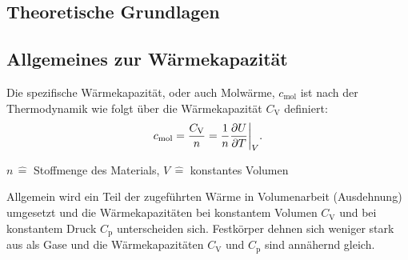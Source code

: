 \subsection{Theoretische Grundlagen}
\subsection{Allgemeines zur Wärmekapazität}
Die spezifische Wärmekapazität, oder auch Molwärme, $c_{\text{mol}}$ ist nach der Thermodynamik wie folgt über die Wärmekapazität $C_{\text{V}}$ definiert:
\begin{equation*}
	c_{\text{mol}} = \frac{C_{\text{V}}}{n} = \frac{1}{n} \frac{\partial U}{\partial T} \bigg{\vert}_{V}.
\end{equation*}
\begin{center}
	\tiny{$n \, \widehat{=}$ Stoffmenge des Materials, $V \, \widehat{=}$ konstantes Volumen }
\end{center}
Allgemein wird ein Teil der zugeführten Wärme in Volumenarbeit (Ausdehnung) umgesetzt und die Wärmekapazitäten bei konstantem Volumen $C_{\text{V}}$ und bei konstantem Druck $C_{\text{p}}$ unterscheiden sich.
Festkörper dehnen sich weniger stark aus als Gase und die Wärmekapazitäten $C_{\text{V}}$ und $C_{\text{p}}$ sind annähernd gleich.

